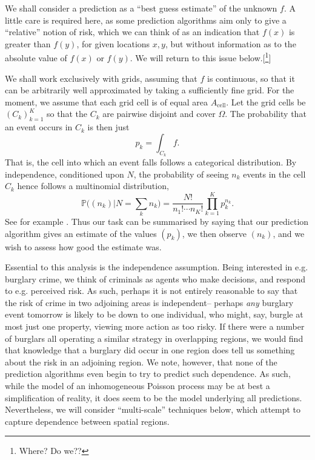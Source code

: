 \documentclass[twoside,a4paper,twocolumn,10pt]{article}
\theoremstyle{plain}
\theoremstyle{definition}
\begin{document}
We shall consider a prediction as a ``best guess estimate'' of the unknown $f$.  A little
care is required here, as some prediction algorithms aim only to give a ``relative'' notion
of risk, which we can think of as an indication that $f(x)$ is greater than $f(y)$, for given
locations $x,y$, but without information as to the absolute value of $f(x)$ or $f(y)$.  We
will return to this issue below.[\footnote{Where?  Do we??}]

We shall work exclusively with grids, assuming that $f$ is continuous, so that it can be
arbitrarily well approximated by taking a sufficiently fine grid.  For the moment, we assume
that each grid cell is of equal area $A_{\text{cell}}$.  Let the grid cells be $(C_k)_{k=1}^K$
so that the $C_k$ are pairwise disjoint and cover $\Omega$.  The probability that an event
occurs in $C_k$ is then just
\[ p_k = \int_{C_k} f. \]
That is, the cell into which an event falls follows a categorical distribution.
By independence, conditioned upon $N$, the probability
of seeing $n_k$ events in the cell $C_k$ hence follows a multinomial distribution,
\[ \mathbb P\big((n_k)|N=\sum_k n_k\big) = \frac{N!}{n_1! \cdots n_K!} \prod_{k=1}^K p_k^{n_k}. \]
See for example \cite{jkb}.
Thus our task can be summarised by saying that our prediction algorithm gives an estimate
of the values $(p_k)$, we then observe $(n_k)$, and we wish to assess how good the estimate was.

Essential to this analysis is the independence assumption.  Being interested in e.g.
burglary crime, we think of criminals as agents who make decisions, and respond to e.g.
perceived risk.  As such, perhaps it is not entirely reasonable to say that the risk of
crime in two adjoining areas is independent-- perhaps \emph{any} burglary event tomorrow
is likely to be down to one individual, who might, say, burgle at most just one property,
viewing more action as too risky.  If there were a number of burglars all operating a similar
strategy in overlapping regions, we would find that knowledge that a burglary did occur in
one region does tell us something about the risk in an adjoining region.  We note, however,
that none of the prediction algorithms even begin to try to predict such dependence.
As such, while the model of an inhomogeneous Poisson process may be at best a simplification
of reality, it does seem to be the model underlying all predictions.
Nevertheless, we will consider ``multi-scale'' techniques below,
which attempt to capture dependence between spatial regions.
\end{document}
